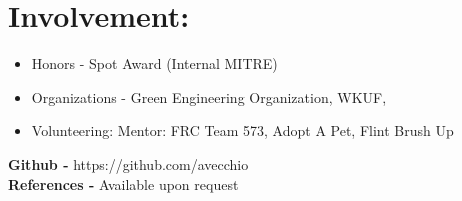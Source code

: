 \documentclass{res}
\begin{document}
\section{Involvement:}
\begin{itemize}
\item Honors - Spot Award (Internal MITRE)
\item Organizations - Green Engineering Organization, WKUF, %
\item Volunteering: Mentor: FRC Team 573, Adopt A Pet, Flint Brush Up
\end{itemize}

\begin{center}
\textbf{Github - }https://github.com/avecchio\\
\textbf{References - }Available upon request
\end{center}
\end{document}
